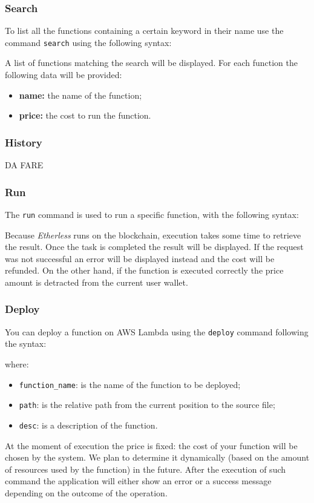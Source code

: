 \subsubsection{Search}
To list all the functions containing a certain keyword in their name use the command \texttt{search} using the following syntax:
\begin{center}
\end{center}

A list of functions matching the search will be displayed. For each function the following data will be provided:
\begin{itemize}
	\item \textbf{name: } the name of the function;
	\item \textbf{price: } the cost to run the function.
\end{itemize}

\subsubsection{History}
DA FARE

\subsubsection{Run}
The \texttt{run} command is used to run a specific function, with the following syntax: \\
\begin{center}
\end{center}
Because \textit{Etherless} runs on the blockchain, execution takes some time to retrieve the result. Once the task is completed the result will be displayed. If the request was not successful an error will be displayed instead and the cost will be refunded. On the other hand, if the function is executed correctly the price amount is detracted from the current user wallet.

\subsubsection{Deploy}
You can deploy a function on AWS Lambda using the \texttt{deploy} command following the syntax:
\begin{center}
\end{center}
\noindent where:
\begin{itemize}
	\item \texttt{function\_name}: is the name of the function to be deployed;
	\item \texttt{path}: is the relative path from the current position to the source file;
	\item \texttt{desc}: is a description of the function.
\end{itemize}
At the moment of execution the price is fixed: the cost of your function will be chosen by the system. We plan to determine it dynamically (based on the amount of resources used by the function) in the future. After the execution of such command the application will either show an error or a success message depending on the outcome of the operation.

